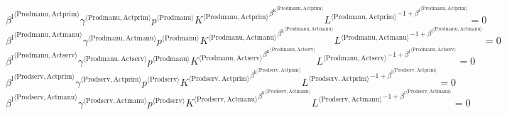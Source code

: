 \begin{equation}
{{\beta^{\mathrm{l}}}^{\langle \mathrm{\mathrm{Prodmanu}},\mathrm{\mathrm{Actprim}}\rangle}} {{\gamma}^{\langle \mathrm{\mathrm{Prodmanu}},\mathrm{\mathrm{Actprim}}\rangle}} {{p}^{\langle \mathrm{Prodmanu}\rangle}} {{{K}^{\langle \mathrm{Prodmanu},\mathrm{Actprim}\rangle}}^{{\beta^{\mathrm{k}}}^{\langle \mathrm{\mathrm{Prodmanu}},\mathrm{\mathrm{Actprim}}\rangle}}} {{{L}^{\langle \mathrm{Prodmanu},\mathrm{Actprim}\rangle}}^{-1 + {\beta^{\mathrm{l}}}^{\langle \mathrm{\mathrm{Prodmanu}},\mathrm{\mathrm{Actprim}}\rangle}}} = 0
\end{equation}
\begin{equation}
{{\beta^{\mathrm{l}}}^{\langle \mathrm{\mathrm{Prodmanu}},\mathrm{\mathrm{Actmanu}}\rangle}} {{\gamma}^{\langle \mathrm{\mathrm{Prodmanu}},\mathrm{\mathrm{Actmanu}}\rangle}} {{p}^{\langle \mathrm{Prodmanu}\rangle}} {{{K}^{\langle \mathrm{Prodmanu},\mathrm{Actmanu}\rangle}}^{{\beta^{\mathrm{k}}}^{\langle \mathrm{\mathrm{Prodmanu}},\mathrm{\mathrm{Actmanu}}\rangle}}} {{{L}^{\langle \mathrm{Prodmanu},\mathrm{Actmanu}\rangle}}^{-1 + {\beta^{\mathrm{l}}}^{\langle \mathrm{\mathrm{Prodmanu}},\mathrm{\mathrm{Actmanu}}\rangle}}} = 0
\end{equation}
\begin{equation}
{{\beta^{\mathrm{l}}}^{\langle \mathrm{\mathrm{Prodmanu}},\mathrm{\mathrm{Actserv}}\rangle}} {{\gamma}^{\langle \mathrm{\mathrm{Prodmanu}},\mathrm{\mathrm{Actserv}}\rangle}} {{p}^{\langle \mathrm{Prodmanu}\rangle}} {{{K}^{\langle \mathrm{Prodmanu},\mathrm{Actserv}\rangle}}^{{\beta^{\mathrm{k}}}^{\langle \mathrm{\mathrm{Prodmanu}},\mathrm{\mathrm{Actserv}}\rangle}}} {{{L}^{\langle \mathrm{Prodmanu},\mathrm{Actserv}\rangle}}^{-1 + {\beta^{\mathrm{l}}}^{\langle \mathrm{\mathrm{Prodmanu}},\mathrm{\mathrm{Actserv}}\rangle}}} = 0
\end{equation}
\begin{equation}
{{\beta^{\mathrm{l}}}^{\langle \mathrm{\mathrm{Prodserv}},\mathrm{\mathrm{Actprim}}\rangle}} {{\gamma}^{\langle \mathrm{\mathrm{Prodserv}},\mathrm{\mathrm{Actprim}}\rangle}} {{p}^{\langle \mathrm{Prodserv}\rangle}} {{{K}^{\langle \mathrm{Prodserv},\mathrm{Actprim}\rangle}}^{{\beta^{\mathrm{k}}}^{\langle \mathrm{\mathrm{Prodserv}},\mathrm{\mathrm{Actprim}}\rangle}}} {{{L}^{\langle \mathrm{Prodserv},\mathrm{Actprim}\rangle}}^{-1 + {\beta^{\mathrm{l}}}^{\langle \mathrm{\mathrm{Prodserv}},\mathrm{\mathrm{Actprim}}\rangle}}} = 0
\end{equation}
\begin{equation}
{{\beta^{\mathrm{l}}}^{\langle \mathrm{\mathrm{Prodserv}},\mathrm{\mathrm{Actmanu}}\rangle}} {{\gamma}^{\langle \mathrm{\mathrm{Prodserv}},\mathrm{\mathrm{Actmanu}}\rangle}} {{p}^{\langle \mathrm{Prodserv}\rangle}} {{{K}^{\langle \mathrm{Prodserv},\mathrm{Actmanu}\rangle}}^{{\beta^{\mathrm{k}}}^{\langle \mathrm{\mathrm{Prodserv}},\mathrm{\mathrm{Actmanu}}\rangle}}} {{{L}^{\langle \mathrm{Prodserv},\mathrm{Actmanu}\rangle}}^{-1 + {\beta^{\mathrm{l}}}^{\langle \mathrm{\mathrm{Prodserv}},\mathrm{\mathrm{Actmanu}}\rangle}}} = 0
\end{equation}

